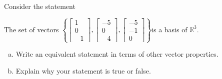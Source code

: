 
\begin{exerciseStatement}


Consider the statement 
\begin{center}\begin{minipage}{0.8\textwidth}
 The set of vectors \( \left\{ \left[\begin{array}{c}
1 \\
0 \\
-1
\end{array}\right] , \left[\begin{array}{c}
-5 \\
0 \\
-4
\end{array}\right] , \left[\begin{array}{c}
-5 \\
-1 \\
0
\end{array}\right] \right\} \)is a basis of \(\mathbb{R}^3\). 
\end{minipage}\end{center}
    


\begin{enumerate}[(a)]
\item  Write an equivalent statement in terms of other vector properties.
\item  Explain why your statement is true or false.
\end{enumerate}
    
\end{exerciseStatement}
    
